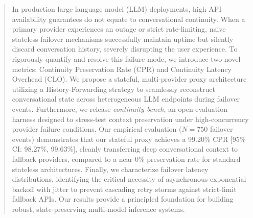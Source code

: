 \begin{abstract}
In production large language model (LLM) deployments, high API availability guarantees do not equate to conversational continuity. When a primary provider experiences an outage or strict rate-limiting, naive stateless failover mechanisms successfully maintain uptime but silently discard conversation history, severely disrupting the user experience. To rigorously quantify and resolve this failure mode, we introduce two novel metrics: Continuity Preservation Rate (CPR) and Continuity Latency Overhead (CLO). We propose a stateful, multi-provider proxy architecture utilizing a History-Forwarding strategy to seamlessly reconstruct conversational state across heterogeneous LLM endpoints during failover events. Furthermore, we release \textit{continuity-bench}, an open evaluation harness designed to stress-test context preservation under high-concurrency provider failure conditions. Our empirical evaluation ($N=750$ failover events) demonstrates that our stateful proxy achieves a 99.20\% CPR [95\% CI: 98.27\%, 99.63\%], cleanly transferring deep conversational context to fallback providers, compared to a near-0\% preservation rate for standard stateless architectures. Finally, we characterize failover latency distributions, identifying the critical necessity of asynchronous exponential backoff with jitter to prevent cascading retry storms against strict-limit fallback APIs. Our results provide a principled foundation for building robust, state-preserving multi-model inference systems.
\end{abstract}
